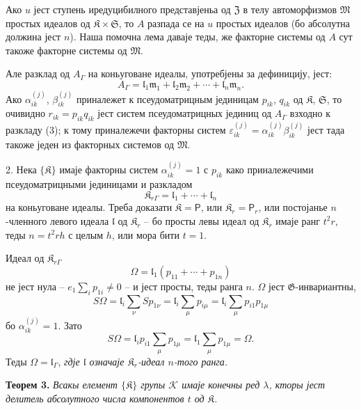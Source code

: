 \documentclass[11pt]{article}
\begin{document}
Ако \(u\) јест ступень иредуцибилного представјеньа од \(\mathfrak Z\) в телу автоморфизмов \(\mathfrak M\) простых идеалов од \(\mathfrak K\times\mathfrak S\), то \(A\) разпада се на \(u\) простых идеалов (бо абсолутна должина јест \(n\)). Наша помочна лема даваје теды, же факторне системы од \(A\) сут такоже факторне системы од \(\mathfrak M\).

Але разклад од \(A_\Gamma\) на коньуговане идеалы, употребјены за дефиницију, јест:
\[
\tag{3}
A_\Gamma=\mathfrak l_1\mathfrak m_1+\mathfrak l_2\mathfrak m_2+\cdots+\mathfrak l_n\mathfrak m_n.
\]
Ако \(\alpha_{ik}^{(j)}\), \(\beta_{ik}^{(j)}\) приналежет к псеудоматрицным јединицам \(p_{ik}\), \(q_{ik}\) од \(\mathfrak K\), \(\mathfrak S\), то очивидно \(r_{ik}=p_{ik}q_{ik}\) јест систем псеудоматрицных јединиц од \(A_\Gamma\) взходно к разкладу (3); к тому приналежечи факторны систем \(\varepsilon_{ik}^{(j)}=\alpha_{ik}^{(j)}\beta_{ik}^{(j)}\) јест тада такоже једен из факторных системов од \(\mathfrak M\).

2. Нека \(\{\mathfrak K\}\) имаје факторны систем \(\alpha_{ik}^{(j)}=1\) с \(p_{ik}\) како приналежечими псеудоматрицными јединицами и разкладом
\[
\mathfrak K_{r\Gamma}=\mathfrak l_1+\cdots+\mathfrak l_n
\]
на коньуговане идеалы. Треба доказати \(\mathfrak K=\mathsf P\), или \(\mathfrak K_r=\mathsf P_r\), или постојанье \(n\)-членного левого идеала \(\mathfrak l\) од \(\mathfrak K_r\) -- бо просты левы идеал од \(\mathfrak K_r\) имаје ранг \(t^2r\), теды \(n=t^2rh\) с целым \(h\), или мора бити \(t=1\).

Идеал од \(\mathfrak K_{r\Gamma}\)
\[
\Omega=\mathfrak l_1(p_{11}+\cdots+p_{1n})
\]
не јест нула -- \(e_1\sum_i p_{1i}\ne0\) -- и јест просты, теды ранга \(n\). \(\Omega\) јест \(\mathfrak G\)-инвариантны,
\[
S\Omega
=\mathfrak l_i\sum_\nu S p_{1\nu}
=\mathfrak l_i\sum_\mu p_{i\mu}
=\mathfrak l_i\sum_\mu p_{i1}p_{1\mu}
\]
бо \(\alpha_{ik}^{(j)}=1\). Зато
\[
S\Omega=\mathfrak l_ip_{i1}\sum_\mu p_{1\mu}
=\mathfrak l_1\sum_\mu p_{1\mu}
=\Omega.
\]
Теды \(\Omega=\mathfrak l_\Gamma\), \emph{гдје \(\mathfrak l\) означаје \(\mathfrak K_r\)-идеал \(n\)-того ранга.}

\textbf{Теорем 3.} \emph{Всакы елемент \(\{\mathfrak K\}\) групы \(\mathscr K\) имаје конечны ред \(\lambda\), кторы јест делитель абсолутного числа компонентов \(t\) од \(\mathfrak K\).}
\end{document}
